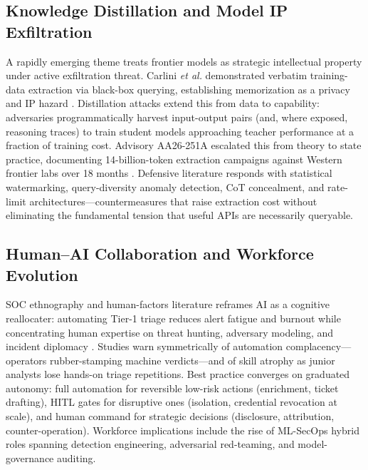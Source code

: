 \documentclass[conference,10pt,twocolumn,a4paper]{IEEEtran}
\begin{document}
\subsection{Knowledge Distillation and Model IP Exfiltration}
A rapidly emerging theme treats frontier models as strategic intellectual property under active exfiltration threat. Carlini \emph{et al.} demonstrated verbatim training-data extraction via black-box querying, establishing memorization as a privacy and IP hazard \cite{carlini2021extracting}. Distillation attacks extend this from data to capability: adversaries programmatically harvest input-output pairs (and, where exposed, reasoning traces) to train student models approaching teacher performance at a fraction of training cost. Advisory AA26-251A escalated this from theory to state practice, documenting 14-billion-token extraction campaigns against Western frontier labs over 18 months \cite{cisa_aa26_251a, cisa_aa26_251a_distillation}. Defensive literature responds with statistical watermarking, query-diversity anomaly detection, CoT concealment, and rate-limit architectures---countermeasures that raise extraction cost without eliminating the fundamental tension that useful APIs are necessarily queryable.

\subsection{Human--AI Collaboration and Workforce Evolution}
SOC ethnography and human-factors literature reframes AI as a cognitive reallocater: automating Tier-1 triage reduces alert fatigue and burnout while concentrating human expertise on threat hunting, adversary modeling, and incident diplomacy \cite{cisa_agentic_ai_2026, nist_ir_8596_2025}. Studies warn symmetrically of automation complacency---operators rubber-stamping machine verdicts---and of skill atrophy as junior analysts lose hands-on triage repetitions. Best practice converges on graduated autonomy: full automation for reversible low-risk actions (enrichment, ticket drafting), HITL gates for disruptive ones (isolation, credential revocation at scale), and human command for strategic decisions (disclosure, attribution, counter-operation). Workforce implications include the rise of ML-SecOps hybrid roles spanning detection engineering, adversarial red-teaming, and model-governance auditing.
\end{document}
